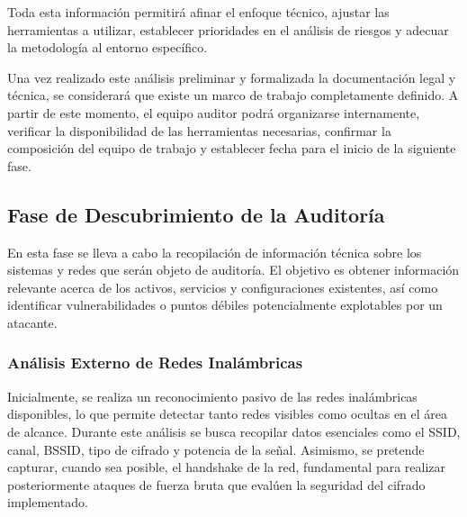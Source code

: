 \documentclass[a4paper, 11pt]{article}
\begin{document}
Toda esta información permitirá afinar el enfoque técnico, ajustar las herramientas a utilizar, establecer prioridades en el análisis de riesgos y adecuar la metodología al entorno específico.
\par\vspace{0.5cm}

Una vez realizado este análisis preliminar y formalizada la documentación legal y técnica, se considerará que existe un marco de trabajo completamente definido. A partir de este momento, el equipo auditor podrá organizarse internamente, verificar la disponibilidad de las herramientas necesarias, confirmar la composición del equipo de trabajo y establecer fecha para el inicio de la siguiente fase.
\par\vspace{0.5cm}


\subsection{Fase de Descubrimiento de la Auditoría}
\par\vspace{0.5cm}

En esta fase se lleva a cabo la recopilación de información técnica sobre los sistemas y redes que serán objeto de auditoría. El objetivo es obtener información relevante acerca de los activos, servicios y configuraciones existentes, así como identificar vulnerabilidades o puntos débiles potencialmente explotables por un atacante.


\subsubsection{Análisis Externo de Redes Inalámbricas}
\label{sec:analisis_redes_inalambricas}


\par\vspace{0.5cm}
Inicialmente, se realiza un reconocimiento pasivo de las redes inalámbricas disponibles, lo que permite detectar tanto redes visibles como ocultas en el área de alcance. Durante este análisis se busca recopilar datos esenciales como el SSID, canal, BSSID, tipo de cifrado y potencia de la señal. Asimismo, se pretende capturar, cuando sea posible, el handshake de la red, fundamental para realizar posteriormente ataques de fuerza bruta que evalúen la seguridad del cifrado implementado.

\par\vspace{0.5cm}
\end{document}
